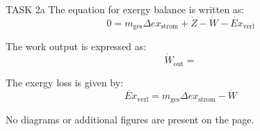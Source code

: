 TASK 2a  
The equation for exergy balance is written as:  
\[
0 = m_{\text{ges}} \Delta ex_{\text{strom}} + \dot{Z} - \dot{W} - \dot{Ex}_{\text{verl}}
\]  

The work output is expressed as:  
\[
\dot{W}_{\text{out}} =
\]  

The exergy loss is given by:  
\[
\dot{Ex}_{\text{verl}} = m_{\text{ges}} \Delta ex_{\text{strom}} - \dot{W}
\]  

No diagrams or additional figures are present on the page.